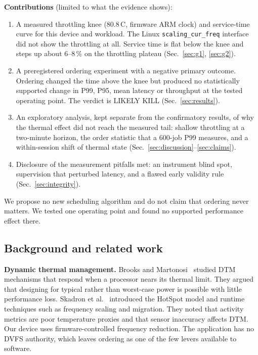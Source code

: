 \documentclass[conference,a4paper]{IEEEtran}
\newcommand{\degC}{\,\textdegree{}C}
\newcommand{\code}[1]{\texttt{#1}}
\begin{document}
\textbf{Contributions} (limited to what the evidence shows):
\begin{enumerate}
\item A measured throttling knee (80.8\degC{}, firmware ARM clock) and service-time curve for this device and
workload. The Linux \code{scaling\_cur\_freq} interface did not show the throttling at all. Service time is flat
below the knee and steps up about 6--8\,\% on the throttling plateau (Sec.~\ref{sec:g1}, \ref{sec:g2}).
\item A preregistered ordering experiment with a negative primary outcome. Ordering changed the time above the
knee but produced no statistically supported change in P99, P95, mean latency or throughput at the tested
operating point. The verdict is LIKELY KILL (Sec.~\ref{sec:results}).
\item An exploratory analysis, kept separate from the confirmatory results, of why the thermal effect did not
reach the measured tail: shallow throttling at a two-minute horizon, the order statistic that a 600-job P99
measures, and a within-session shift of thermal state (Sec.~\ref{sec:discussion}--\ref{sec:claims}).
\item Disclosure of the measurement pitfalls met: an instrument blind spot, supervision that perturbed latency, and
a flawed early validity rule (Sec.~\ref{sec:integrity}).
\end{enumerate}
We propose no new scheduling algorithm and do not claim that ordering never matters. We tested one operating point
and found no supported performance effect there.

\subsection{Background and related work}
\textbf{Dynamic thermal management.} Brooks and Martonosi~\cite{brooks2001} studied DTM mechanisms that respond
when a processor nears its thermal limit. They argued that designing for typical rather than worst-case power is
possible with little performance loss. Skadron et al.~\cite{skadron2003} introduced the HotSpot model and runtime
techniques such as frequency scaling and migration. They noted that activity metrics are poor temperature proxies
and that sensor inaccuracy affects DTM. Our device uses firmware-controlled frequency reduction. The application
has no DVFS authority, which leaves ordering as one of the few levers available to software.
\end{document}
